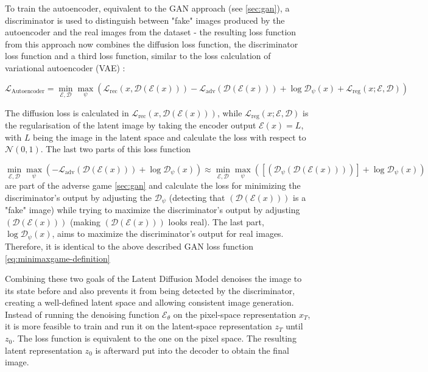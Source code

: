 To train the autoencoder, equivalent to the GAN approach (see \autoref{sec:gan}), a discriminator is used to distinguish between "fake" images produced by the autoencoder and the real images from the dataset - the resulting loss function from this approach now combines the diffusion loss function, the discriminator loss function and a third loss function, similar to the loss calculation of variational autoencoder (VAE) \cite{kingma2022autoencodingvariationalbayes}:

\begin{equation}
\mathcal{L}_{\text{Autoencoder}} =  \min_{\mathcal{E}, \mathcal{D}} \max_\psi \left( \mathcal{L}_{\text{rec}}(x, \mathcal{D}(\mathcal{E}(x))) - \mathcal{L}_{\text{adv}}(\mathcal{D}(\mathcal{E}(x))) + \log \mathcal{D}_\psi(x) + \mathcal{L}_{\text{reg}}(x; \mathcal{E}, \mathcal{D}) \right)
\label{eq:firststageloss}
\end{equation}

The diffusion loss is calculated in $\mathcal{L}_{\text{rec}}(x, \mathcal{D}(\mathcal{E}(x)))$, while $\mathcal{L}_{\text{reg}}(x; \mathcal{E}, \mathcal{D})$ is the regularisation of the latent image by taking the encoder output $\mathcal{E}(x) = L$, with $L$ being the image in the latent space and calculate the loss with respect to $\mathcal{N}(0, 1)$. The last two parts of this loss function 

\begin{equation}
\min_{\mathcal{E}, \mathcal{D}} \max_\psi \left(- \mathcal{L}_{\text{adv}}(\mathcal{D}(\mathcal{E}(x))) + \log \mathcal{D}_\psi(x)\right) 
\approx 
\min_{\mathcal{E}, \mathcal{D}} \max_\psi \left(\left[(\mathcal{D}_\psi(\mathcal{D}(\mathcal{E}(x)))) \right] + \log \mathcal{D}_\psi(x)\right)
\end{equation}
are part of the adverse game \autoref{sec:gan} and calculate the loss for minimizing the discriminator's output by adjusting the $\mathcal{D}_\psi$ (detecting that $(\mathcal{D}(\mathcal{E}(x)))$ is a "fake" image) while trying to maximize the discriminator's output by adjusting $(\mathcal{D}(\mathcal{E}(x)))$ (making $(\mathcal{D}(\mathcal{E}(x)))$ looks real). The last part, $\log \mathcal{D}_\psi(x)$, aims to maximize the discriminator's output for real images. Therefore, it is identical to the above described GAN loss function \autoref{eq:minimaxgame-definition}

Combining these two goals of the Latent Diffusion Model denoises the image to its state before and also prevents it from being detected by the discriminator, creating a well-defined latent space and allowing consistent image generation. Instead of running the denoising function $\mathcal{E}_\theta$ on the pixel-space representation $x_T$, it is more feasible to train and run it on the latent-space representation $z_T$ until $z_0$. The loss function is equivalent to the one on the pixel space. The resulting latent representation $z_0$ is afterward put into the decoder to obtain the final image.

